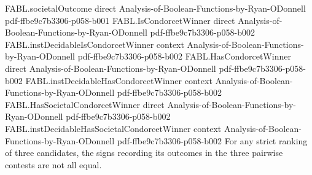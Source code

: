 \begin{theorem}
  {FABL.societalOutcome}
  {direct}
  {Analysis-of-Boolean-Functions-by-Ryan-ODonnell}
  {pdf-ffbe9c7b3306-p058-b001}
\proofstep
  {FABL.IsCondorcetWinner}
  {direct}
  {Analysis-of-Boolean-Functions-by-Ryan-ODonnell}
  {pdf-ffbe9c7b3306-p058-b002}
\proofstep
  {FABL.instDecidableIsCondorcetWinner}
  {context}
  {Analysis-of-Boolean-Functions-by-Ryan-ODonnell}
  {pdf-ffbe9c7b3306-p058-b002}
\proofstep
  {FABL.HasCondorcetWinner}
  {direct}
  {Analysis-of-Boolean-Functions-by-Ryan-ODonnell}
  {pdf-ffbe9c7b3306-p058-b002}
\proofstep
  {FABL.instDecidableHasCondorcetWinner}
  {context}
  {Analysis-of-Boolean-Functions-by-Ryan-ODonnell}
  {pdf-ffbe9c7b3306-p058-b002}
\proofstep
  {FABL.HasSocietalCondorcetWinner}
  {direct}
  {Analysis-of-Boolean-Functions-by-Ryan-ODonnell}
  {pdf-ffbe9c7b3306-p058-b002}
\proofstep
  {FABL.instDecidableHasSocietalCondorcetWinner}
  {context}
  {Analysis-of-Boolean-Functions-by-Ryan-ODonnell}
  {pdf-ffbe9c7b3306-p058-b002}
For any strict ranking of three candidates, the signs recording its outcomes in the
three pairwise contests are not all equal.
\end{theorem}

